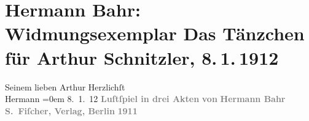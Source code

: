 

         \renewcommand{\erwaehnteInstitutionen}{Institutionen: S. Fischer Verlag}
         \renewcommand{\erwaehnteOrte}{Orte: Berlin, Wien}
         \renewcommand{\erwaehnteWerke}{Werke: Das Tänzchen. Lustspiel in drei Akten}
               \section[Hermann Bahr: Widmungsexemplar Das Tänzchen für Arthur Schnitzler, 8. 1. 1912]{ Hermann Bahr: Widmungsexemplar Das Tänzchen für Arthur Schnitzler, 8. 1. 1912}\nopagebreak{}\rehead{ }\begin{ledgroupsized}[t]{13cm}\normalsize\beginnumbering \toendnotes[C]{\smallbreak\pagebreak[2]} 
\pstart
           \noindent{}{\pb}Seinem lieben Arthur\pend
           \pstart
           Herzlichſt{\\[\baselineskip]}\spacefill\mbox{Hermann}\pend
           \leftskip=0em{}\pstart
           \noindent{}8. 1. 12\pend
           {\bigskip}\pstart
           \noindent{}\centering{}{\pb}\textcolor{gray}{\textbf{}}\pend
           \pstart
           \noindent{}\centering{}\textcolor{gray}{\textbf{Luſtſpiel in drei Akten}}\pend
           \pstart
           \noindent{}\centering{}\textcolor{gray}{\textbf{von}}\pend
           \pstart
           \noindent{}\centering{}\textcolor{gray}{\textbf{Hermann Bahr}}\pend
           {\bigskip}\pstart
           \noindent{}\centering{}\textcolor{gray}{\textbf{S. Fiſcher, Verlag, Berlin}}\pend
           \pstart
           \noindent{}\centering{}\textcolor{gray}{\textbf{1911}}\pend
           
         
         \endnumbering{}\end{ledgroupsized}  \newcommand{\dateiname}{L02050}\newcommand{\titel}{Hermann Bahr: Widmungsexemplar Das Tänzchen für Arthur Schnitzler, 8. 1. 1912}\newcommand{\editorInnen}{ Kurt Ifkovits,  Martin Anton Müller}
      